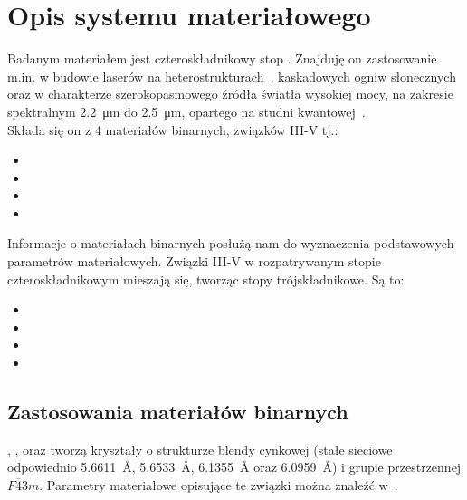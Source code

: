 \documentclass[12pt,openany,a4paper]{book}
\begin{document}
	
	\let\cleardoublepage\clearpage
	{\hypersetup{linkcolor=black}
		\tableofcontents{}
	}
	
	\mainmatter{}
	
	
	\chapter{Opis systemu materiałowego}\label{chapt:opis}
	
	Badanym materiałem jest czteroskładnikowy stop . Znajduję on zastosowanie m.in. w budowie
	laserów na heterostrukturach~\autocite{Morosini1993}, kaskadowych ogniw słonecznych~\autocite{Timmons1981} oraz
	w charakterze szerokopasmowego źródła światła wysokiej mocy, na zakresie spektralnym \SI{2.2}{\micro\metre} do \SI{2.5}{\micro\metre},
	opartego na studni kwantowej~\autocite{Wootten2014}.\\

	Składa się on z 4 materiałów binarnych, związków III-V tj.:
	\begin{itemize}
		\item {}
		\item {}
		\item {}
		\item {}
	\end{itemize} 
	Informacje o materiałach binarnych posłużą nam do wyznaczenia podstawowych parametrów materiałowych.
	Związki III-V w rozpatrywanym stopie czteroskładnikowym mieszają się, tworząc stopy trójskładnikowe.
	Są to:
	\begin{itemize}
		\item {}
		\item {}
		\item {}
		\item {}
	\end{itemize}
	
	\section{Zastosowania materiałów binarnych}
	, ,  oraz  tworzą kryształy o strukturze blendy cynkowej (stałe sieciowe odpowiednio \SI{5.6611}{\angstrom}, \SI{5.6533}{\angstrom}, \SI{6.1355}{\angstrom} oraz \SI{6.0959}{\angstrom}) i grupie przestrzennej
	\(F\overline{4}3m\). Parametry materiałowe opisujące te związki można znaleźć w~\textcite{Adachi1985,Vurgaftman2001,Adachi1989,Adachi2017}.
\end{document}
